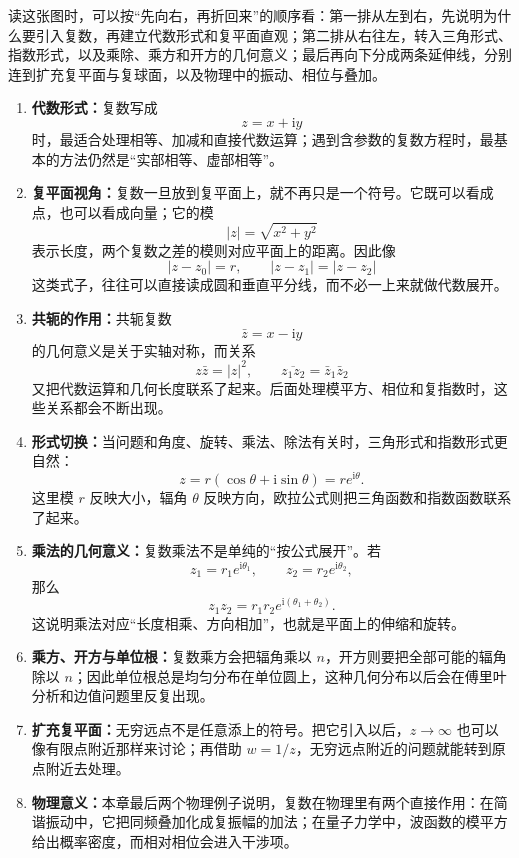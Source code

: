 读这张图时，可以按``先向右，再折回来''的顺序看：第一排从左到右，先说明为什么要引入复数，再建立代数形式和复平面直观；第二排从右往左，转入三角形式、指数形式，以及乘除、乘方和开方的几何意义；最后再向下分成两条延伸线，分别连到扩充复平面与复球面，以及物理中的振动、相位与叠加。

\begin{zhongyao}[本章主要结论]
\raggedright
\begin{enumerate}
    \item \textbf{代数形式：}复数写成
    \[
        z=x+\mathrm{i}y
    \]
    时，最适合处理相等、加减和直接代数运算；遇到含参数的复数方程时，最基本的方法仍然是``实部相等、虚部相等''。

    \item \textbf{复平面视角：}复数一旦放到复平面上，就不再只是一个符号。它既可以看成点，也可以看成向量；它的模
    \[
        |z|=\sqrt{x^2+y^2}
    \]
    表示长度，两个复数之差的模则对应平面上的距离。因此像
    \[
        |z-z_0|=r,\qquad |z-z_1|=|z-z_2|
    \]
    这类式子，往往可以直接读成圆和垂直平分线，而不必一上来就做代数展开。

    \item \textbf{共轭的作用：}共轭复数
    \[
        \bar z=x-\mathrm{i}y
    \]
    的几何意义是关于实轴对称，而关系
    \[
        z\bar z=|z|^2,\qquad
        \overline{z_1z_2}=\bar z_1\bar z_2
    \]
    又把代数运算和几何长度联系了起来。后面处理模平方、相位和复指数时，这些关系都会不断出现。

    \item \textbf{形式切换：}当问题和角度、旋转、乘法、除法有关时，三角形式和指数形式更自然：
    \[
        z=r(\cos\theta+\mathrm{i}\sin\theta)=re^{\mathrm{i}\theta}.
    \]
    这里模 $r$ 反映大小，辐角 $\theta$ 反映方向，欧拉公式则把三角函数和指数函数联系了起来。

    \item \textbf{乘法的几何意义：}复数乘法不是单纯的``按公式展开''。若
    \[
        z_1=r_1e^{\mathrm{i}\theta_1},\qquad z_2=r_2e^{\mathrm{i}\theta_2},
    \]
    那么
    \[
        z_1z_2=r_1r_2e^{\mathrm{i}(\theta_1+\theta_2)}.
    \]
    这说明乘法对应``长度相乘、方向相加''，也就是平面上的伸缩和旋转。

    \item \textbf{乘方、开方与单位根：}复数乘方会把辐角乘以 $n$，开方则要把全部可能的辐角除以 $n$；因此单位根总是均匀分布在单位圆上，这种几何分布以后会在傅里叶分析和边值问题里反复出现。

    \item \textbf{扩充复平面：}无穷远点不是任意添上的符号。把它引入以后，$z\to\infty$ 也可以像有限点附近那样来讨论；再借助 $w=1/z$，无穷远点附近的问题就能转到原点附近去处理。

    \item \textbf{物理意义：}本章最后两个物理例子说明，复数在物理里有两个直接作用：在简谐振动中，它把同频叠加化成复振幅的加法；在量子力学中，波函数的模平方给出概率密度，而相对相位会进入干涉项。
\end{enumerate}
\end{zhongyao}


